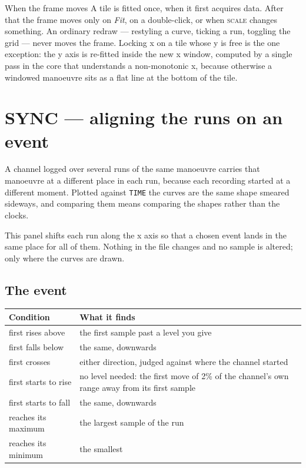 \documentclass[11pt,a4paper,oneside]{report}
\newcommand{\code}[1]{\texttt{#1}}
\newcommand{\tab}[1]{\textsc{#1}}
\begin{document}
\begin{aoenote}{When the frame moves}
A tile is fitted once, when it first acquires data. After that the frame moves
only on \emph{Fit}, on a double-click, or when \tab{scale} changes something. An
ordinary redraw --- restyling a curve, ticking a run, toggling the grid --- never
moves the frame. Locking x on a tile whose y is free is the one exception: the y
axis is re-fitted inside the new x window, computed by a single pass in the core
that understands a non-monotonic x, because otherwise a windowed manoeuvre sits
as a flat line at the bottom of the tile.
\end{aoenote}

\section{SYNC --- aligning the runs on an event}
\label{sec:sync}


A channel logged over several runs of the same manoeuvre carries that manoeuvre
at a different place in each run, because each recording started at a different
moment. Plotted against \code{TIME} the curves are the same shape smeared
sideways, and comparing them means comparing the shapes rather than the clocks.

This panel shifts each run along the x axis so that a chosen event lands in the
same place for all of them. Nothing in the file changes and no sample is
altered; only where the curves are drawn.

\subsection*{The event}

\begin{longtable}{@{}p{}p{}@{}}
\toprule
\textbf{Condition} & \textbf{What it finds} \\
\midrule
\endhead
first rises above & the first sample past a level you give \\
first falls below & the same, downwards \\
first crosses & either direction, judged against where the channel started \\
first starts to rise & no level needed: the first move of 2\% of the channel's
own range away from its first sample \\
first starts to fall & the same, downwards \\
reaches its maximum & the largest sample of the run \\
reaches its minimum & the smallest \\
\bottomrule
\end{longtable}
\end{document}
